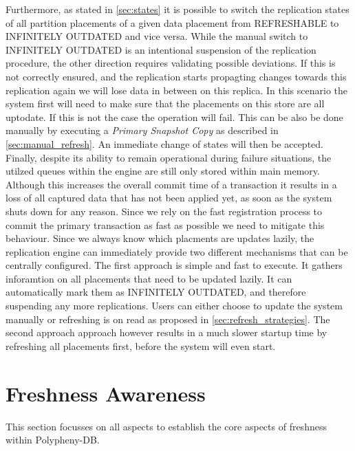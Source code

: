 Furthermore, as stated in \ref{sec:states} it is possible to switch the replication states of all partition placements of a given data placement from REFRESHABLE to 
INFINITELY OUTDATED and vice versa.
While the manual switch to INFINITELY OUTDATED is an intentional suspension of the replication procedure, the other direction requires validating possible deviations.
If this is not correctly ensured, and the replication starts propagting changes towards this replication again we will lose data in between on this replica.
In this scenario the system first will need to make sure that the placements on this store are all uptodate. If this is not the case the operation will fail. 
This can be also be done manually by executing a \emph{Primary Snapshot Copy} as described in \ref{sec:manual_refresh}. An immediate change of states will then be accepted.\\

Finally, despite its ability to remain operational during failure situations, the utilzed queues within the engine are still only stored within main memory.
Although this increases the overall commit time of a transaction it results in a loss of all captured data that has not been applied yet, as soon as the system 
shuts down for any reason. Since we rely on the fast registration process to commit the primary transaction as fast as possible we need to mitigate this behaviour.
Since we always know which placments are updates lazily, the replication engine can immediately provide two different mechanisms that can be centrally configured. 
The first approach is simple and fast to execute. It gathers inforamtion on all placements that need to be updated lazily. It can automatically mark them as INFINITELY OUTDATED, 
and therefore suspending any more replications. Users can either choose to update the system manually or refreshing is on read as proposed in \ref{sec:refresh_strategies}.
The second approach approach however results in a much slower startup time by refreshing all placements first, before the system will even start.









\section{Freshness Awareness}
This section focusses on all aspects to establish the core aspects of freshness within Polypheny-DB. 

